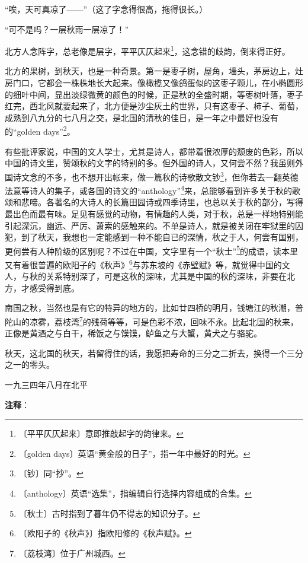 \documentclass[12pt,UTF-8,openany]{ctexbook}
\begin{document}
\begin{normalsize}
    “唉，天可真凉了——”（这了字念得很高，拖得很长。）
    
    “可不是吗？一层秋雨一层凉了！”
    
    北方人念阵字，总老像是层字，平平仄仄起来\footnote{〔平平仄仄起来〕意即推敲起字的韵律来。}，这念错的歧韵，倒来得正好。
    
    北方的果树，到秋天，也是一种奇景。第一是枣子树，屋角，墙头，茅房边上，灶房门口，它都会一株株地长大起来。像橄榄又像鸽蛋似的这枣子颗儿，在小椭圆形的细叶中间，显出淡绿微黄的颜色的时候，正是秋的全盛时期，等枣树叶落，枣子红完，西北风就要起来了，北方便是沙尘灰土的世界，只有这枣子、柿子、葡萄，成熟到八九分的七八月之交，是北国的清秋的佳日，是一年之中最好也没有的“golden days”\footnote{〔golden days〕英语“黄金般的日子”，指一年中最好的时光。}。
    
    有些批评家说，中国的文人学士，尤其是诗人，都带着很浓厚的颓废的色彩，所以中国的诗文里，赞颂秋的文字的特别的多。但外国的诗人，又何尝不然？我虽则外国诗文念的不多，也不想开出帐来，做一篇秋的诗歌散文钞\footnote{〔钞〕同“抄”。}，但你若去一翻英德法意等诗人的集子，或各国的诗文的“anthology”\footnote{〔anthology〕英语“选集”，指编辑自行选择内容组成的合集。}来，总能够看到许多关于秋的歌颂和悲啼。各著名的大诗人的长篇田园诗或四季诗里，也总以关于秋的部分，写得最出色而最有味。足见有感觉的动物，有情趣的人类，对于秋，总是一样地特别能引起深沉，幽远、严厉、萧索的感触来的。不单是诗人，就是被关闭在牢狱里的囚犯，到了秋天，我想也一定能感到一种不能自已的深情，秋之于人，何尝有国别，更何尝有人种阶级的区别呢？不过在中国，文字里有一个“秋士”\footnote{〔秋士〕古时指到了暮年仍不得志的知识分子。}的成语，读本里又有着很普遍的欧阳子的《秋声》\footnote{〔欧阳子的《秋声》〕指欧阳修的《秋声赋》。}与苏东坡的《赤壁赋》等，就觉得中国的文人，与秋的关系特别深了，可是这秋的深味，尤其是中国的秋的深味，非要在北方，才感受得到底。
    
    南国之秋，当然也是有它的特异的地方的，比如廿四桥的明月，钱塘江的秋潮，普陀山的凉雾，荔枝湾\footnote{〔荔枝湾〕位于广州城西。}的残荷等等，可是色彩不浓，回味不永。比起北国的秋来，正像是黄酒之与白干，稀饭之与馍馍，鲈鱼之与大蟹，黄犬之与骆驼。
    
    秋天，这北国的秋天，若留得住的话，我愿把寿命的三分之二折去，换得一个三分之一的零头。
    
    \hfill 一九三四年八月在北平
    
\end{normalsize}


\newpage

\textbf{注释}：

\vspace{-1em}
\end{document}
